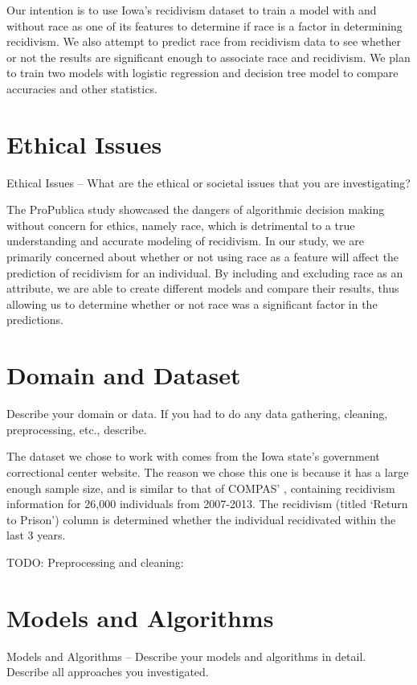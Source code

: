 \documentclass[10.5pt, sigconf]{acmart}
\begin{document}
Our intention is to use Iowa’s recidivism dataset to train a model with and without race as one of its features to determine if race is a factor in determining recidivism. We also attempt to predict race from recidivism data to see whether or not the results are significant enough to associate race and recidivism. We plan to train two models with logistic regression and decision tree model to compare accuracies and other statistics.  

\section{Ethical Issues}
Ethical Issues – What are the ethical or societal issues that you are investigating?

The ProPublica study showcased the dangers of algorithmic decision making without concern for ethics, namely race, which is detrimental to a true understanding and accurate modeling of recidivism. In our study, we are primarily concerned about whether or not using race as a feature will affect the prediction of recidivism for an individual. By including and excluding race as an attribute, we are able to create different models and compare their results, thus allowing us to determine whether or not race was a significant factor in the predictions.

\section{Domain and Dataset}
Describe your domain or data. If you had to do any data gathering, cleaning, preprocessing, etc., describe.

The dataset we chose to work with comes from the Iowa state’s government correctional center website. The reason we chose this one is because it has a large enough sample size, and is similar to that of COMPAS' , containing recidivism information for 26,000 individuals from 2007-2013. The recidivism (titled ‘Return to Prison’) column is determined whether the individual recidivated within the last 3 years.

TODO: Preprocessing and cleaning: 



\section{Models and Algorithms}
Models and Algorithms – Describe your models and algorithms in detail. Describe all approaches you investigated. 
\end{document}
